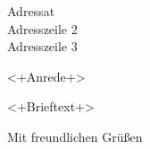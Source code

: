\documentclass[10pt, Format]{scrlttr2}
\begin{document}
\begin{letter}{\bigskip Adressat \\Adresszeile 2\\ Adresszeile 3\\}



\opening{<+Anrede+> }

<+Brieftext+>

\closing{Mit freundlichen Grüßen}
\end{letter}
\end{document}
